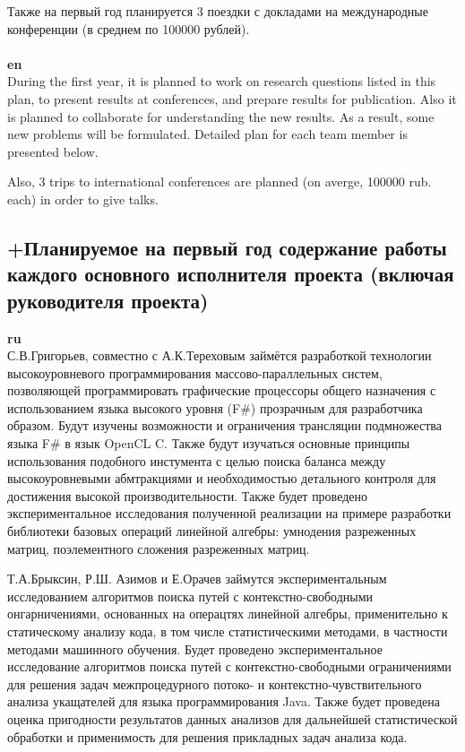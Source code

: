 \documentclass[12pt]{article}  %
\theoremstyle{remark}
\begin{document}
Также на первый год планируется 3 поездки с докладами на международные конференции (в среднем по 100000 рублей).
\\
\\
\textbf{en}\\
During the first year, it is planned to work on research questions listed in this plan, to present results at conferences, and prepare results for publication. Also it is planned to collaborate for understanding the new results. As a result, some new problems will be formulated. Detailed plan for each team member is presented below.

Also, 3 trips to international conferences are planned (on averge, 100000 rub. each) in order to give talks.



\subsection{+Планируемое на первый год содержание работы каждого основного исполнителя проекта (включая руководителя проекта)}

\textbf{ru}\\

С.В.Григорьев, совместно с А.К.Тереховым займётся разработкой технологии высокоуровневого программирования массово-параллельных систем, позволяющей программировать графические процессоры общего назначения с использованием языка высокого уровня (F\#) прозрачным для разработчика образом. Будут изучены возможности и ограничения трансляции подмножества языка F\# в язык OpenCL C. Также будут изучаться основные принципы использования подобного инстумента с целью поиска баланса между высокоуровневыми абмтракциями и необходимостью детального контроля для достижения высокой производительности. Также будет проведено экспериментальное исследования полученной реализации на примере разработки библиотеки базовых операций линейной алгебры: умнодения разреженных матриц, поэлементного сложения разреженных матриц.

Т.А.Брыксин, Р.Ш. Азимов и Е.Орачев займутся экспериментальным исследованием алгоритмов поиска путей с контекстно-свободными онгарничениями, основанных на операцтях линейной алгебры, применительно к статическому анализу кода, в том числе статистическими методами, в частности методами машинного обучения. Будет проведено экспериментальное исследование алгоритмов поиска путей с контекстно-свободными ограничениями для решения задач межпроцедурного потоко- и контекстно-чувствительного анализа укащателей для языка программирования Java. Также будет проведена оценка пригодности результатов данных анализов для дальнейшей статистической обработки и применимость для решения прикладных задач анализа кода.
\end{document}
